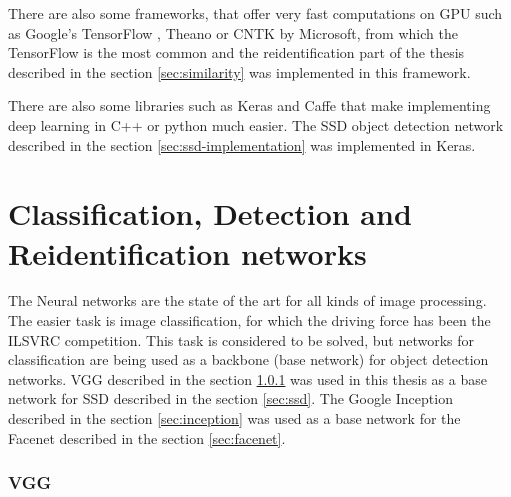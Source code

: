 \documentclass[a4paper,11pt,titlepage,twoside]{article}
\numberwithin{figure}{section}
\begin{document}
There are also some frameworks, that offer very fast computations on GPU such as Google's TensorFlow \cite{abadi2016tensorflow}, Theano \cite{bergstra2011theano} or CNTK\cite{seide2016cntk} by Microsoft, from which the TensorFlow is the most common and the reidentification part of the thesis described in the section \ref{sec:similarity} was implemented in this framework. 

There are also some libraries such as Keras \cite{chollet2015keras} and Caffe \cite{jia2014caffe} that make implementing deep learning in C++ or python much easier. The SSD object detection network described in the section \ref{sec:ssd-implementation} was implemented in Keras.


\clearpage
\section{Classification, Detection and Reidentification networks}

The Neural networks are the state of the art for all kinds of image processing. The easier task is image classification, for which the driving force has been the ILSVRC \cite{deng2009imagenet} competition. This task is considered to be solved, but networks for classification are being used as a backbone (base network) for object detection networks. VGG \cite{simonyan2014very} described in the section \ref{sec:vgg} was used in this thesis as a base network for SSD \cite{li2017fssd} described in the section \ref{sec:ssd}. The Google Inception \cite{szegedy2015going} described in the section \ref{sec:inception} was used as a base network for the Facenet \cite{facenet} described in the section \ref{sec:facenet}.

\subsubsection{VGG}
\label{sec:vgg}
\end{document}
